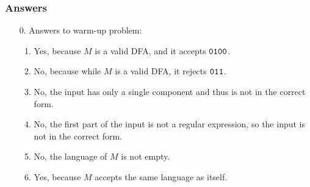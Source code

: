 \documentclass[11pt]{article}
\begin{document}
\if{}
\pagebreak

\subsubsection*{Answers}
\begin{enumerate}
\item[0.] Answers to warm-up problem:

\begin{enumerate}
\item Yes, because $M$ is a valid DFA, and it accepts ${\tt 0100}$.
\item No, because while $M$ is a valid DFA, it rejects ${\tt 011}$.
\item No, the input has only a single component and thus is not in the correct form.
\item No, the first part of the input is not a regular expression, so the input is not in the correct form.
\item No, the language of $M$ is not empty.
\item Yes, because $M$ accepts the same language as itself.
\end{enumerate}

\end{enumerate}
\fi
\end{document}
